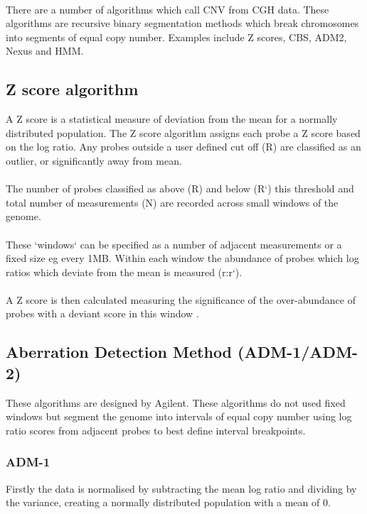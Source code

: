 \paragraph*{}
There are a number of algorithms which call \ac{CNV} from \ac{CGH} data. These algorithms are recursive binary segmentation methods which break chromosomes into segments of equal copy number. Examples include Z scores, \ac{CBS}, \ac{ADM2}, Nexus and \ac{HMM}. 

\subsection{Z score algorithm}
A Z score is a statistical measure of deviation from the mean for a normally distributed population. The Z score algorithm assigns each probe a Z score based on the log ratio. Any probes outside a user defined cut off (R) are classified as an outlier, or significantly away from mean. 
\paragraph*{}
The number of probes classified as above (R) and below (R`) this threshold and total number of measurements (N) are recorded across small windows of the genome. 
\paragraph*{}
These `windows` can be specified as a number of adjacent measurements or a fixed size eg every 1MB. Within each window the abundance of probes which log ratios which deviate from the mean is measured (r:r`).
\paragraph*{}
A Z score is then calculated measuring the significance of the over-abundance of probes with a deviant score in this window \cite{agilent_technologies_agilent_2011}.

\subsection{Aberration Detection Method (ADM-1/ADM-2)}
These algorithms are designed by Agilent\cite{agilent_technologies_agilent_2011}. These algorithms do not used fixed windows but segment the genome into intervals of equal copy number using log ratio scores from adjacent probes to best define interval breakpoints.

\subsubsection{ADM-1}
Firstly the data is normalised by subtracting the mean log ratio and dividing by the variance, creating a normally distributed population with a mean of 0. 
